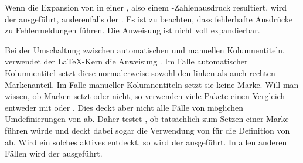 \begin{Declaration}
\end{Declaration}
Wenn
die Expansion von  in einer ,
also einem \eTeX-Zahlenausdruck resultiert, wird der 
ausgeführt, anderenfalls der . Es ist zu
beachten, dass fehlerhafte Ausdrücke zu Fehlermeldungen
führen. Die Anweisung ist nicht voll expandierbar.%
\iffalse%
\iftrue%
\ Von dieser Anweisung gibt es keine interne Variante.%
\else%
\ Es gibt keine interne Variante.%
\fi%
\fi%
\EndIndexGroup


\begin{Declaration}
\end{Declaration}
Bei der Umschaltung zwischen automatischen
und manuellen Kolumnentiteln, verwendet der \LaTeX-Kern die Anweisung
.
Im Falle automatischer Kolumnentitel setzt diese normalerweise sowohl den
linken als auch rechten Markenanteil. Im Falle manueller Kolumnentiteln setzt
sie keine Marke. Will man wissen, ob  Marken
setzt oder nicht, so verwenden viele Pakete einen Vergleich entweder mit
 oder
. Dies deckt aber nicht alle Fälle von möglichen
Umdefinierungen von  ab. Daher testet
, ob  tatsächlich zum
Setzen einer Marke führen würde und deckt dabei sogar die Verwendung von
 für die Definition von  ab. Wird
ein solches aktives  entdeckt, so wird der
 ausgeführt. In allen anderen Fällen wird der
 ausgeführt.%
